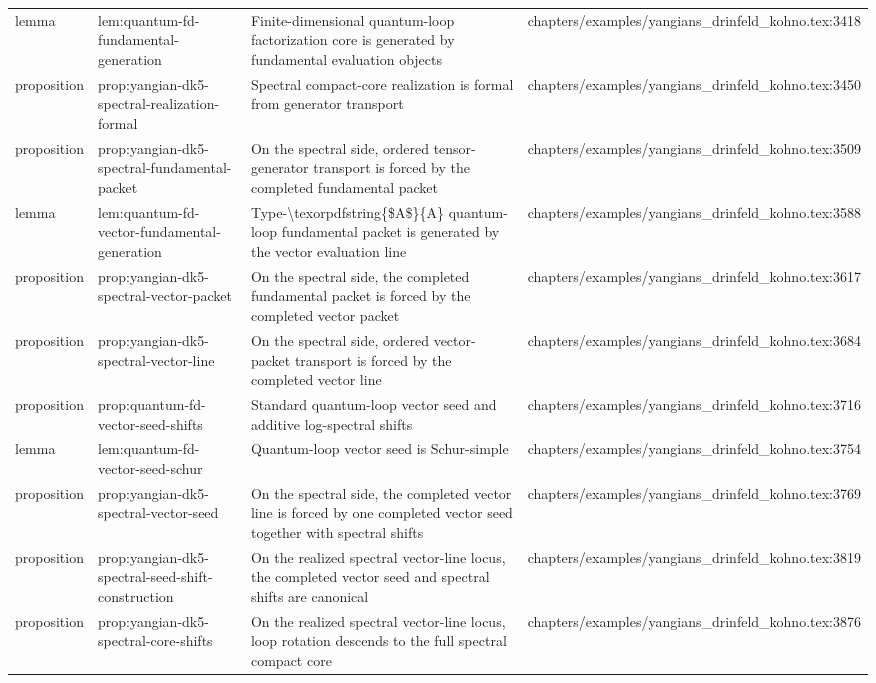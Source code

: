 \documentclass[11pt]{article}
\begin{document}
\begin{longtable}{L{0.10\textwidth}L{0.26\textwidth}L{0.42\textwidth}L{0.22\textwidth}}
lemma & lem:quantum-fd-fundamental-generation & Finite-dimensional quantum-loop factorization core is generated by fundamental evaluation objects & chapters/examples/yangians\_drinfeld\_kohno.tex:3418\\
proposition & prop:yangian-dk5-spectral-realization-formal & Spectral compact-core realization is formal from generator transport & chapters/examples/yangians\_drinfeld\_kohno.tex:3450\\
proposition & prop:yangian-dk5-spectral-fundamental-packet & On the spectral side, ordered tensor-generator transport is forced by the completed fundamental packet & chapters/examples/yangians\_drinfeld\_kohno.tex:3509\\
lemma & lem:quantum-fd-vector-fundamental-generation & Type-\textbackslash{}texorpdfstring\{\$A\$\}\{A\} quantum-loop fundamental packet is generated by the vector evaluation line & chapters/examples/yangians\_drinfeld\_kohno.tex:3588\\
proposition & prop:yangian-dk5-spectral-vector-packet & On the spectral side, the completed fundamental packet is forced by the completed vector packet & chapters/examples/yangians\_drinfeld\_kohno.tex:3617\\
proposition & prop:yangian-dk5-spectral-vector-line & On the spectral side, ordered vector-packet transport is forced by the completed vector line & chapters/examples/yangians\_drinfeld\_kohno.tex:3684\\
proposition & prop:quantum-fd-vector-seed-shifts & Standard quantum-loop vector seed and additive log-spectral shifts & chapters/examples/yangians\_drinfeld\_kohno.tex:3716\\
lemma & lem:quantum-fd-vector-seed-schur & Quantum-loop vector seed is Schur-simple & chapters/examples/yangians\_drinfeld\_kohno.tex:3754\\
proposition & prop:yangian-dk5-spectral-vector-seed & On the spectral side, the completed vector line is forced by one completed vector seed together with spectral shifts & chapters/examples/yangians\_drinfeld\_kohno.tex:3769\\
proposition & prop:yangian-dk5-spectral-seed-shift-construction & On the realized spectral vector-line locus, the completed vector seed and spectral shifts are canonical & chapters/examples/yangians\_drinfeld\_kohno.tex:3819\\
proposition & prop:yangian-dk5-spectral-core-shifts & On the realized spectral vector-line locus, loop rotation descends to the full spectral compact core & chapters/examples/yangians\_drinfeld\_kohno.tex:3876\\

\end{longtable}
\end{document}
